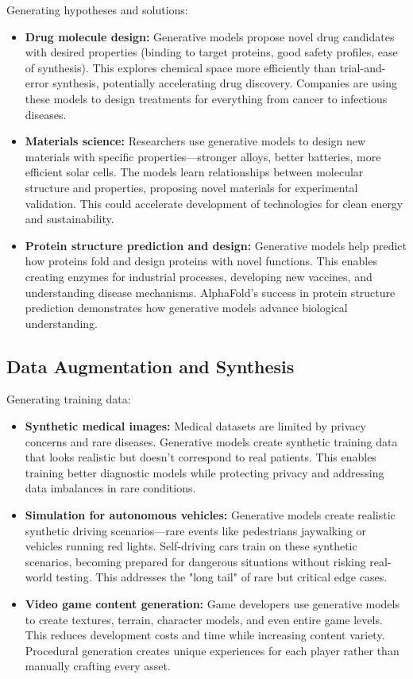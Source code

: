 Generating hypotheses and solutions:

\begin{itemize}
    \item \textbf{Drug molecule design:} Generative models propose novel drug candidates with desired properties (binding to target proteins, good safety profiles, ease of synthesis). This explores chemical space more efficiently than trial-and-error synthesis, potentially accelerating drug discovery. Companies are using these models to design treatments for everything from cancer to infectious diseases.
    
    \item \textbf{Materials science:} Researchers use generative models to design new materials with specific properties—stronger alloys, better batteries, more efficient solar cells. The models learn relationships between molecular structure and properties, proposing novel materials for experimental validation. This could accelerate development of technologies for clean energy and sustainability.
    
    \item \textbf{Protein structure prediction and design:} Generative models help predict how proteins fold and design proteins with novel functions. This enables creating enzymes for industrial processes, developing new vaccines, and understanding disease mechanisms. AlphaFold's success in protein structure prediction demonstrates how generative models advance biological understanding.
\end{itemize}

\subsection{Data Augmentation and Synthesis}

Generating training data:

\begin{itemize}
    \item \textbf{Synthetic medical images:} Medical datasets are limited by privacy concerns and rare diseases. Generative models create synthetic training data that looks realistic but doesn't correspond to real patients. This enables training better diagnostic models while protecting privacy and addressing data imbalances in rare conditions.
    
    \item \textbf{Simulation for autonomous vehicles:} Generative models create realistic synthetic driving scenarios—rare events like pedestrians jaywalking or vehicles running red lights. Self-driving cars train on these synthetic scenarios, becoming prepared for dangerous situations without risking real-world testing. This addresses the "long tail" of rare but critical edge cases.
    
    \item \textbf{Video game content generation:} Game developers use generative models to create textures, terrain, character models, and even entire game levels. This reduces development costs and time while increasing content variety. Procedural generation creates unique experiences for each player rather than manually crafting every asset.
\end{itemize}

